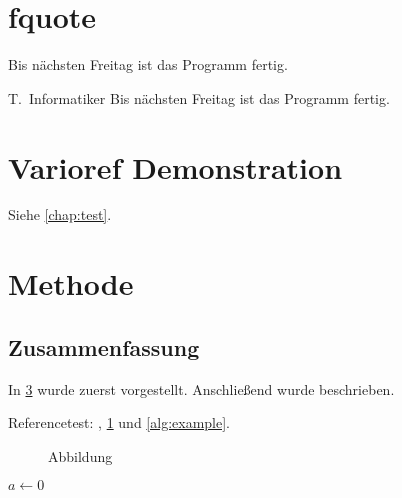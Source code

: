 \documentclass[paper=a5,twoside,fontsize=10pt, DIV=calc, headings=small,bibliography=totoc, listof=totoc]{scrbook}
\begin{document}
\section{fquote}

\begin{fquote}[T.\ Informatiker]
Bis nächsten Freitag ist das Programm fertig.
\end{fquote}

\begin{gfquote}{T.\ Informatiker}
Bis nächsten Freitag ist das Programm fertig.
\end{gfquote}


\section{Varioref Demonstration}
Siehe \vref{chap:test}.

\section{Methode}
\label{sec:method}

\label{sec:rqa}
\blindtext

\blindtext

\subsection{Zusammenfassung}
In \cref{sec:method} wurde zuerst  vorgestellt.
Anschließend wurde  beschrieben.

Referencetest: , \cref{fig:Abbildung} und \cref{alg:example}.

\begin{figure}
\missingfigure{}
\caption{Abbildung}
\label{fig:Abbildung}
\end{figure}

\begin{algorithm}
\caption{$algo$}
\label{alg:example}
\begin{algorithmic}[1]
\State $a \gets 0$
\end{algorithmic}
\end{algorithm}
\end{document}
